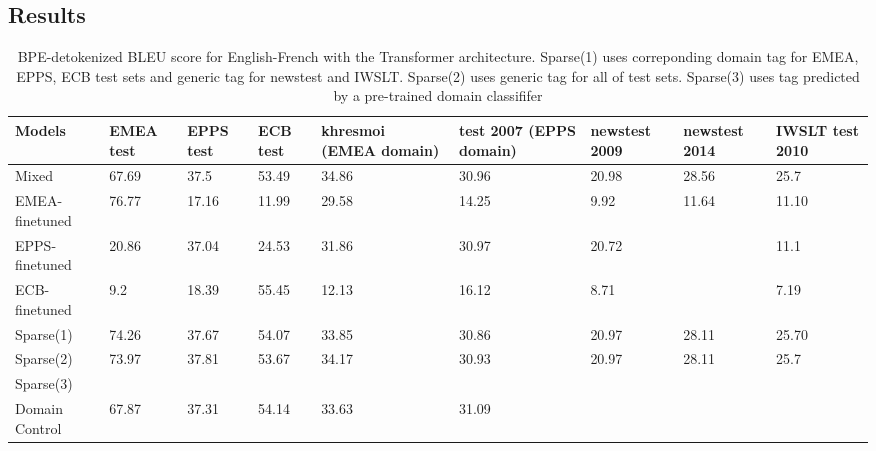 \documentclass[11pt,a4paper]{article}
\begin{document}
\subsection{Results}
\begin{table}
\begin{center}
 \begin{tabularx}{\textwidth}{|| X | X | X | X | X | X | X | X | X ||} 
 \hline
 Models & EMEA test & EPPS test & ECB test & khresmoi (EMEA domain) & test 2007 (EPPS domain) & newstest 2009 & newstest 2014 & IWSLT test 2010 \\ [0.5ex] 
 \hline\hline
 Mixed & 67.69 & 37.5 & 53.49 & 34.86 & 30.96 & 20.98 & 28.56 & 25.7 \\
 \hline
 EMEA-finetuned & 76.77 & 17.16 & 11.99 & 29.58 & 14.25 & 9.92 & 11.64 & 11.10 \\
 \hline
 EPPS-finetuned & 20.86 & 37.04 & 24.53 & 31.86 & 30.97 & 20.72 &  & 11.1 \\
 \hline
 ECB-finetuned & 9.2 & 18.39 & 55.45 & 12.13 & 16.12 & 8.71 &  & 7.19 \\
 \hline
 Sparse(1) & 74.26 & 37.67 & 54.07 & 33.85 & 30.86 & 20.97 & 28.11 & 25.70 \\
 \hline
 Sparse(2) & 73.97 & 37.81 & 53.67 & 34.17 & 30.93 & 20.97 & 28.11 & 25.7 \\
 \hline
 Sparse(3) &  &  &  &  &  &  &  & \\
 \hline
 Domain Control & 67.87 & 37.31 & 54.14 & 33.63 & 31.09 &  & & \\
 \hline
\end{tabularx}
\end{center}

\caption{BPE-detokenized BLEU score for English-French with the Transformer architecture. Sparse(1) uses correponding domain tag for EMEA, EPPS, ECB test sets and generic tag for newstest and IWSLT. Sparse(2) uses generic tag for all of test sets. Sparse(3) uses tag predicted by a pre-trained domain classififer}
\label{tab:1}
\end{table}
\end{document}
